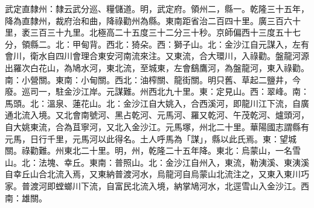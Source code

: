 \begin{pinyinscope}
武定直隸州：隸云武分巡、糧儲道。明，武定府。領州二，縣一。乾隆三十五年，降為直隸州，裁府治和曲，降祿勸州為縣。東南距省治二百四十里。廣三百六十里，袤三百三十九里。北極高二十五度三十二分三十秒。京師偏西十三度五十七分，領縣二。北：甲甸背。西北：猗朵。西：獅子山。北：金沙江自元謀入，左有會川，衛水自四川會理合東安河南流來注。又東流，合大環川，入祿勸。盤龍河源出羅次白花山，為鳩水河，東北流，至城東，左會鷂鷹河，為盤龍河，東入祿勸。南：小營關。東南：小甸關。西北：油榨關、龍街關。明只舊、草起二鹽井，今廢。巡司一，駐金沙江岸。元謀難。州西北九十里。東：定見山。西：翠峰。南：馬頭。北：溫泉、蓮花山。北：金沙江自大姚入，合西溪河，即龍川江下流，自廣通北流入境。又北會南號河、黑占乾河、元馬河、羅又乾河、午茂乾河、爐頭河，自大姚東流，合為苴寧河，又北入金沙江。元馬塚，州北二十里。華陽國志謂縣有元馬，日行千里，元馬河以此得名。土人呼馬為「謀」，縣以此氏焉。東：望城關。祿勸難。州東北二十里。明，州，乾隆二十五年降。東北：烏蒙山，一名雪山。北：法塊、幸丘。東南：普照山。北：金沙江自州入，東流，勒洟溪、東洟溪自幸丘山合北流入焉，又東納普渡河水，烏龍河自烏蒙山北流注之，又東入東川巧家。普渡河即螳螂川下流，自富民北流入境，納掌鳩河水，北逕雪山入金沙江。西南：雄關。


\end{pinyinscope}
